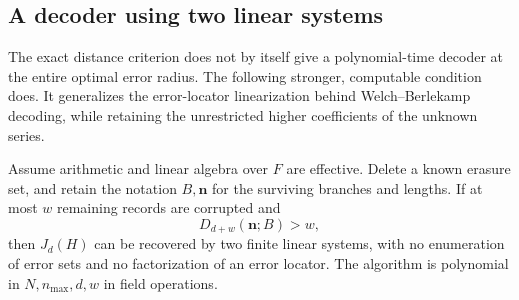 \subsection{A decoder using two linear systems}

The exact distance criterion does not by itself give a polynomial-time
decoder at the entire optimal error radius. The following stronger,
computable condition does. It generalizes the error-locator linearization
behind Welch--Berlekamp decoding, while retaining the unrestricted higher
coefficients of the unknown series.

\begin{theorem}\label{thm:decode}
Assume arithmetic and linear algebra over $F$ are effective. Delete a known
erasure set, and retain the notation $B,\mathbf n$ for the surviving
branches and lengths. If at most $w$ remaining records are corrupted and
\[
 D_{d+w}(\mathbf n;B)>w,
\]
then $J_d(H)$ can be recovered by two finite linear systems, with no
enumeration of error sets and no factorization of an error locator. The
algorithm is polynomial in $N,n_{\max},d,w$ in field operations.
\end{theorem}

